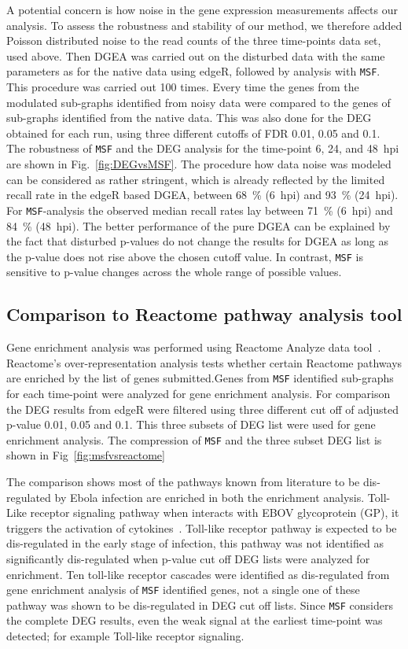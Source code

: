 \documentclass[10pt,a4paper,twocolumn]{article}
\begin{document}
A potential concern is how noise in the gene expression measurements
affects our analysis. To assess the robustness and stability of our method,
we therefore added Poisson distributed noise
to the read counts of the three time-points data set, used above.
Then DGEA was carried out on the disturbed data
with the same parameters as for the native data using edgeR, followed by
analysis with \texttt{MSF}. This procedure was carried out 100 times.
Every time the genes from the modulated sub-graphs identified from noisy
data were compared to the genes of sub-graphs identified from the native
data. This was also done for the DEG obtained for each run, using three different cutoffs of
FDR 0.01, 0.05 and 0.1. The robustness of \texttt{MSF} and the DEG analysis
for the time-point 6, 24, and 48~hpi are shown in
Fig.~\ref{fig:DEGvsMSF}. The procedure how data noise was modeled can be
considered as rather stringent, which is already reflected by the limited
recall rate in the edgeR based DGEA, between 68~\% (6~hpi) and 93~\%
(24~hpi). For \texttt{MSF}-analysis the observed median recall rates lay
between 71~\% (6~hpi) and 84~\% (48~hpi). The better performance of the
pure DGEA can be explained by the fact that disturbed p-values do not
change the results for DGEA as long as the p-value does not rise above the
chosen cutoff value. In contrast, \texttt{MSF} is sensitive to p-value
changes across the whole range of possible values.


\subsection*{Comparison to Reactome pathway analysis tool}

Gene enrichment analysis was performed using Reactome Analyze data
tool~\cite{Reactome}. Reactome's over-representation analysis tests whether
certain Reactome pathways are enriched by the list of genes submitted.Genes from \texttt{MSF} identified
sub-graphs for each time-point were analyzed for gene enrichment analysis.  For
comparison the DEG results from edgeR were filtered using three different cut off of
adjusted p-value 0.01, 0.05 and 0.1. This three subsets of DEG list were used for gene
enrichment analysis. The compression of \texttt{MSF}  and the three subset DEG list is shown in Fig~\ref{fig:msfvsreactome}

The comparison shows most of the pathways known from literature
to be dis-regulated by Ebola infection are enriched in both the enrichment
analysis. Toll-Like receptor signaling pathway when interacts with EBOV
glycoprotein (GP), it triggers the activation of
cytokines~\cite{Olejnik}. Toll-like receptor pathway is expected to be dis-regulated in the early stage of infection,  this pathway was not identified as significantly dis-regulated when p-value
cut off DEG lists were analyzed for enrichment. Ten toll-like receptor cascades were identified as dis-regulated from gene enrichment analysis of \texttt{MSF} identified genes, not a single one of these pathway was shown to be dis-regulated in DEG cut off lists. Since \texttt{MSF}
considers the complete DEG results, even the weak signal at the earliest
time-point was detected; for example Toll-like receptor signaling.
\end{document}
